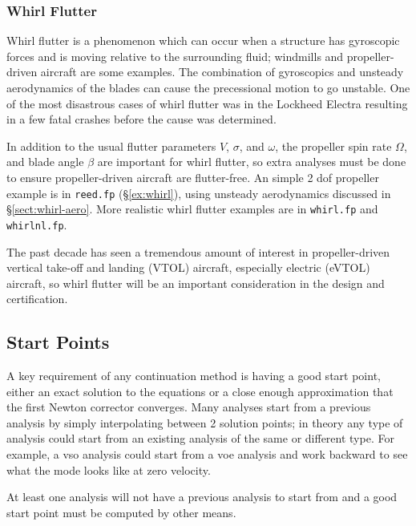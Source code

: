 \documentclass[11pt,openany,twoside]{book}
\numberwithin{equation}{section}		%
\newcommand{\Code}[1]{{\small\tt #1}}
\newcommand{\Sectref}[1]{\S\ref{#1}}
\begin{document}
\subsubsection{Whirl Flutter}\label{sect:whirl-solns}
Whirl flutter is a phenomenon which can occur when a structure has gyroscopic
forces and is moving relative to the surrounding fluid; windmills and
propeller-driven aircraft are some examples.
The combination of gyroscopics and unsteady aerodynamics of the blades
can cause the precessional motion to go unstable.
One of the most disastrous cases of whirl flutter was in the Lockheed
Electra resulting in a few fatal crashes before the cause was determined.

In addition to the usual flutter parameters $V$, $\sigma$, and $\omega$,
the propeller spin rate $\Omega$, and blade angle $\beta$ 
are important
for whirl flutter, so extra analyses must be done to ensure
propeller-driven aircraft are flutter-free.
An simple 2 dof propeller example is in \Code{reed.fp} (\Sectref{ex:whirl}),
using unsteady aerodynamics discussed in \Sectref{sect:whirl-aero}.
More realistic whirl flutter examples are in \Code{whirl.fp} and \Code{whirlnl.fp}.

The past decade has seen a tremendous amount of interest in
propeller-driven vertical take-off and landing (VTOL) aircraft,
especially electric (eVTOL) aircraft, so whirl flutter
will be an important consideration in the design and certification.

\subsection{Start Points}\label{sect:startpts}
A key requirement of any continuation method is having a good start
point, either an exact solution to the equations or a close enough
approximation that the first Newton corrector converges.
Many analyses start from a previous analysis by simply interpolating between
2 solution points; in theory any type of analysis
could start from an existing analysis of the same or different type.
For example, a vso analysis could start from a voe analysis and work
backward to see what the mode looks like at zero velocity.
\par
At least one analysis will not have a previous analysis to start from
and a good start point must be computed by other means.
\end{document}
